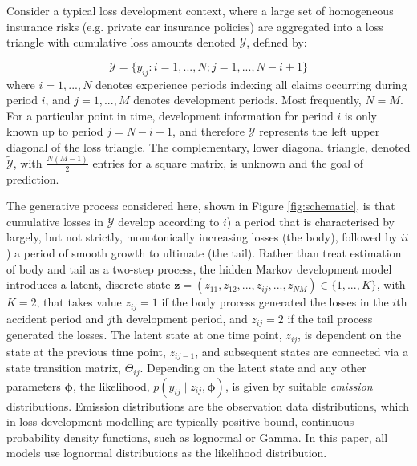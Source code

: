 Consider a typical loss development context, where
a large set of homogeneous insurance risks (e.g. private
car insurance policies) are aggregated
into a loss triangle with
cumulative loss amounts denoted
$\mathcal{Y}$, defined by:

\begin{equation}
	\mathcal{Y} = \{y_{ij} : i = 1, ..., N; j = 1, ..., N - i + 1\}
\end{equation}
%
where $i = 1, ..., N$ denotes experience periods 
indexing all claims occurring during period $i$, and $j = 1, ..., M$
denotes development periods. 
Most frequently, $N = M$.
For a particular point in time,
development information for period $i$ is only known up to period 
$j = N - i + 1$,
and therefore $\mathcal{Y}$ represents the left upper diagonal of
the loss triangle. The complementary, lower diagonal 
triangle, denoted $\tilde{\mathcal{Y}}$,
with $\frac{N (M - 1)}{2}$ entries 
for a square matrix,
is unknown and the goal of prediction.

The generative process considered here, shown in
Figure \ref{fig:schematic},
is that cumulative losses
in $\mathcal{Y}$ develop according to $i$) a period that is
characterised by largely, but not strictly, monotonically 
increasing losses 
(the body), followed by $ii$) a period of smooth
growth to ultimate (the tail). Rather than
treat estimation of body and tail as a two-step process,
the hidden Markov development model introduces a
latent, discrete state $\bm{z} = (z_{11}, z_{12}, ..., z_{ij}, ..., z_{NM})
\in \{1, ...,  K\}$, with $K = 2$, that takes value
$z_{ij} = 1$ if the body process generated the losses in the $i$th
accident period and $j$th development period, and
$z_{ij} = 2$ if the tail process generated the losses.
The latent state at one time point, $z_{ij}$, is dependent
on the state at the previous time point, $z_{ij-1}$,
and subsequent states are connected via a state transition
matrix, $\Theta_{ij}$.
Depending on the latent state and any other parameters
$\bm{\phi}$, the likelihood, $p(y_{ij} \mid z_{ij}, \bm{\phi})$,
is given by suitable \textit{emission} distributions.
Emission distributions are the observation data distributions,
which in loss development modelling are typically
positive-bound, continuous probability density
functions, such as lognormal or Gamma.
In this paper, all models use lognormal distributions
as the likelihood distribution.

